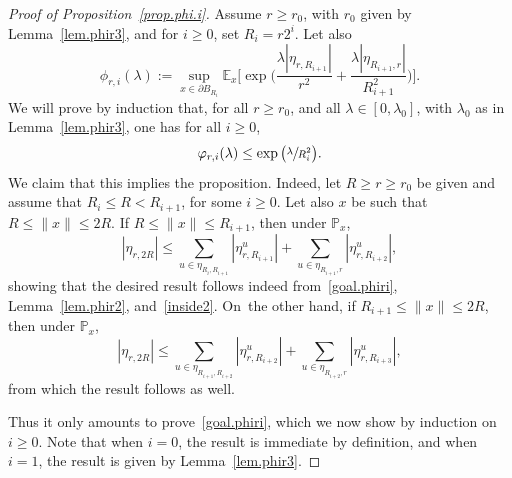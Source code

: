 \begin{proof}[Proof of Proposition~\ref{prop.phi.i}]
Assume $r\ge r_0$, with $r_0$ given by Lemma~\ref{lem.phir3}, and for $i\ge 0$, set $R_i = r2^i$. Let also
\[
\phi_{r,i}(\lambda) := \sup_{x\in \partial B_{R_i}}
\mathbb E_x\Big[\exp\Big(\frac{\lambda|\eta_{r,R_{i+1}}|}{r^2}
+ \frac{\lambda|\eta_{R_{i+1},r}|}{R_{i+1}^2}\Big)\Big].
\]
We will prove by induction that,
for all $r\ge r_0$, and all $\lambda\in[0,\lambda_0]$, with $\lambda_0$ as in Lemma~\ref{lem.phir3}, one has for all $i\ge 0$,
\begin{equation}\label{goal.phiri}
\varphi_{r,i}(\lambda)\le \exp\big(\sfrac{\lambda}{R_i^2}\big).
\end{equation}
We claim that this implies the proposition.
Indeed, let $R\ge r\ge r_0$ be given and assume that $R_i\le R< R_{i+1}$, for some $i\ge 0$. Let also $x$ be such that $R\le \|x\|\le 2R$.
If $R\le \|x\|\le R_{i+1}$, then under $\mathbb P_x$,
\[
|\eta_{r,2R}|\le \sum_{u\in \eta_{R_i,R_{i+1}}} |\eta^u_{r,R_{i+1}}|
+ \sum_{u\in \eta_{R_{i+1},r}} |\eta^u_{r,R_{i+2}}|,
\]
showing that the desired result follows indeed from~\eqref{goal.phiri},
Lemma~\ref{lem.phir2}, and~\eqref{inside2}.
On~the other hand, if $R_{i+1}\le \|x\|\le 2R$, then under $\mathbb P_x$,
\[
|\eta_{r,2R}|\le \sum_{u\in \eta_{R_{i+1},R_{i+2}} }
|\eta^u_{r,R_{i+2}}| + \sum_{u\in \eta_{R_{i+2},r} }
|\eta^u_{r,R_{i+3}}|,
\]
from which the result follows as well.

Thus it only amounts to prove~\eqref{goal.phiri},
which we now show by induction on $i\ge 0$.
Note that when $i=0$, the result is immediate by definition, and when $i=1$, the result is given by Lemma~\ref{lem.phir3}.


\end{proof}
